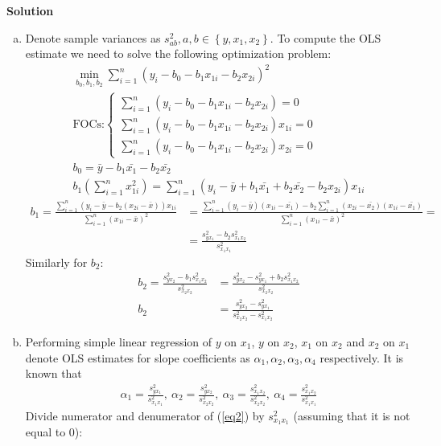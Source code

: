\documentclass[a4paper]{article}
\newcommand{\summa}{\sum_{i=1}^n}
\begin{document}
\textbf{Solution}


\begin{enumerate}[(a)]
	\item Denote sample variances as $s^2_{ab}, a, b \in \left\{y, x_1, x_2\right\}$. To compute the OLS estimate we need to solve the following optimization problem:
	\begin{align*}
	\underset{b_0, b_1, b_2}{\min} \summa (y_i - b_0 - b_1x_{1i} - b_2x_{2i})^2\\
	\text{FOCs:} \begin{cases}
	\summa (y_i - b_0 - b_1x_{1i} - b_2x_{2i}) = 0\\
	\summa (y_i - b_0 - b_1x_{1i} - b_2x_{2i})x_{1i} = 0\\
	\summa (y_i - b_0 - b_1x_{1i} - b_2x_{2i})x_{2i} = 0
	\end{cases}\\
	b_0 = \bar{y} - b_1\bar{x_1} - b_2 \bar{x_2}\\
	b_1\left(\summa x_{1i}^2\right) = \summa (y_i - \bar{y} + b_1\bar{x_1} + b_2\bar{x_2} - b_2x_{2i})x_{1i}
	\end{align*}
	\begin{align*}
	b_1 = \frac{\summa (y_i - \bar{y} - b_2(x_{2i} - \bar{x}))x_{1i}}{\summa (x_{1i} - \bar{x})^2}&=\frac{\summa (y_i - \bar{y})(x_{1i} - \bar{x_1}) - b_2\summa(x_{2i} - \bar{x_2})(x_{1i} - \bar{x_1})}{\summa (x_{1i} - \bar{x})^2} =\\
	&=\frac{s^2_{yx_1} - b_2s^2_{x_1x_2}}{s^2_{x_1x_1}}
	\end{align*}
	Similarly for $b_2$:
	\begin{align}\label{eq2}
	b_2 = \frac{s^2_{yx_2} - b_1s^2_{x_1x_2}}{s^2_{x_2x_2}} &= \frac{s^2_{yx_2} - s^2_{yx_1} + b_2s^2_{x_1x_2}}{s^2_{x_2x_2}} \nonumber\\
	b_2 &= \frac{s^2_{yx_2} - s^2_{yx_1}}{s^2_{x_2x_2} - s^2_{x_1x_2}}
	\end{align}
	\item Performing simple linear regression of $y$ on $x_1$, $y$ on $x_2$, $x_1$ on $x_2$ and $x_2$ on $x_1$ denote OLS estimates for slope coefficients as $\alpha_1, \alpha_2, \alpha_3, \alpha_4$ respectively. It is known that
	\begin{align*}
	\alpha_1 = \frac{s^2_{yx_1}}{s^2_{x_1x_1}},\ \alpha_2 = \frac{s^2_{yx_2}}{s^2_{x_2x_2}},\ \alpha_3 = \frac{s^2_{x_1x_2}}{s^2_{x_2x_2}},\ \alpha_4 = \frac{s^2_{x_1x_2}}{s^2_{x_1x_1}}
	\end{align*}
	Divide numerator and denumerator of (\ref{eq2}) by $s^2_{x_1x_1}$ (assuming that it is not equal to 0):

\end{enumerate}
\end{document}
